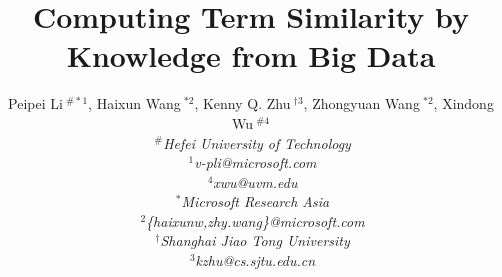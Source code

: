 \documentclass{sig-alternate}
\begin{document}
\title{Computing Term Similarity by Knowledge from Big Data}
\author{%
{Peipei Li{\small $~^{\#*1}$}, Haixun Wang{\small $~^{*2}$}, Kenny Q. Zhu{\small $~^{\dag3}$}, Zhongyuan Wang{\small $~^{*2}$}, Xindong Wu{\small $~^{\#4}$} } %
\vspace{1.6mm}\\
\fontsize{10}{10}\selectfont\itshape
$~^{\#}$Hefei University of Technology\\
\fontsize{9}{9}\selectfont\ttfamily\upshape
$~^{1}$v-pli@microsoft.com\\
\fontsize{9}{9}\selectfont\ttfamily\upshape
$~^{4}$xwu@uvm.edu
\vspace{1.2mm}\\
\fontsize{10}{10}\selectfont\rmfamily\itshape
$~^{*}$Microsoft Research Asia\\
\fontsize{9}{9}\selectfont\ttfamily\upshape
$~^{2}$\{haixunw,zhy.wang\}@microsoft.com\\
\fontsize{10}{10}\selectfont\rmfamily\itshape
$~^{\dag}$Shanghai Jiao Tong University\\
\fontsize{9}{9}\selectfont\ttfamily\upshape
$~^{3}$kzhu@cs.sjtu.edu.cn\\
}
\maketitle
\end{document}
